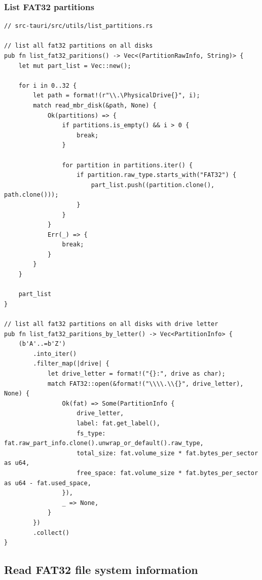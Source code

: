 \documentclass[a4paper,12pt]{report}
\begin{document}
\subsubsection*{List FAT32 partitions}
\begin{verbatim}
// src-tauri/src/utils/list_partitions.rs

// list all fat32 partitions on all disks
pub fn list_fat32_paritions() -> Vec<(PartitionRawInfo, String)> {
    let mut part_list = Vec::new();

    for i in 0..32 {
        let path = format!(r"\\.\PhysicalDrive{}", i);
        match read_mbr_disk(&path, None) {
            Ok(partitions) => {
                if partitions.is_empty() && i > 0 {
                    break;
                }

                for partition in partitions.iter() {
                    if partition.raw_type.starts_with("FAT32") {
                        part_list.push((partition.clone(), path.clone()));
                    }
                }
            }
            Err(_) => {
                break;
            }
        }
    }

    part_list
}

// list all fat32 partitions on all disks with drive letter
pub fn list_fat32_paritions_by_letter() -> Vec<PartitionInfo> {
    (b'A'..=b'Z')
        .into_iter()
        .filter_map(|drive| {
            let drive_letter = format!("{}:", drive as char);
            match FAT32::open(&format!("\\\\.\\{}", drive_letter), None) {
                Ok(fat) => Some(PartitionInfo {
                    drive_letter,
                    label: fat.get_label(),
                    fs_type: fat.raw_part_info.clone().unwrap_or_default().raw_type,
                    total_size: fat.volume_size * fat.bytes_per_sector as u64,
                    free_space: fat.volume_size * fat.bytes_per_sector as u64 - fat.used_space,
                }),
                _ => None,
            }
        })
        .collect()
}
\end{verbatim}

\subsection{Read FAT32 file system information}
\end{document}
